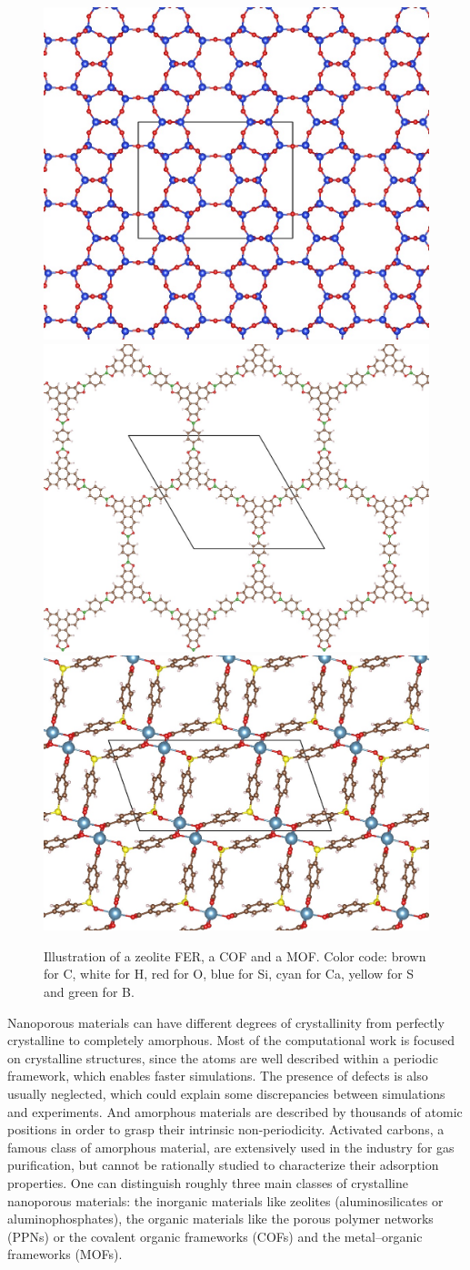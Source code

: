 \documentclass[main.tex]{subfiles}
\begin{document}
\begin{figure}[ht]
  \centering
  \includegraphics[height=0.23\textwidth]{figures/1-screening/FER.jpg}
  \includegraphics[height=0.23\textwidth]{figures/1-screening/COF-5.jpg}
  \includegraphics[height=0.23\textwidth]{figures/1-screening/SBMOF-1.jpg}
  \caption{Illustration of a zeolite FER\autocite{FER}, a COF\autocite{Cote_2005} and a MOF\autocite{KAXQIL}. Color code: brown for C, white for H, red for O, blue for Si, cyan for Ca, yellow for S and green for B.}
\end{figure}

Nanoporous materials can have different degrees of crystallinity from perfectly crystalline to completely amorphous. Most of the computational work is focused on crystalline structures, since the atoms are well described within a periodic framework, which enables faster simulations. The presence of defects is also usually neglected, which could explain some discrepancies between simulations and experiments. And amorphous materials are described by thousands of atomic positions in order to grasp their intrinsic non-periodicity.\autocite{Thyagarajan_2020} Activated carbons, a famous class of amorphous material, are extensively used in the industry for gas purification, but cannot be rationally studied to characterize their adsorption properties. One can distinguish roughly three main classes of crystalline nanoporous materials: the inorganic materials like zeolites (aluminosilicates or aluminophosphates), the organic materials like the porous polymer networks (PPNs) or the covalent organic frameworks (COFs) and the metal--organic frameworks (MOFs).
\end{document}

